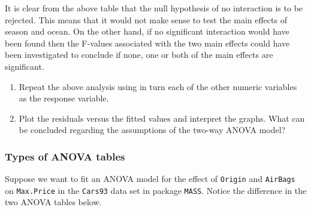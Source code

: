 \documentclass[
]{book}
\begin{document}
It is clear from the above table that the null hypothesis of no interaction is to be rejected. This means that it would not make sense to test the main effects of season and ocean. On the other hand, if no significant interaction would have been found then the F-values associated with the two main effects could have been investigated to conclude if none, one or both of the main effects are significant.

\begin{enumerate}
\def\labelenumi{(\alph{enumi})}
\item
  Repeat the above analysis using in turn each of the other numeric variables as the response variable.
\item
  Plot the residuals versus the fitted values and interpret the graphs. What can be concluded regarding the assumptions of the two-way ANOVA model?
\end{enumerate}

\subsubsection{Types of ANOVA tables}\label{types-of-anova-tables}

Suppose we want to fit an ANOVA model for the effect of \texttt{Origin} and \texttt{AirBags} on \texttt{Max.Price} in the \texttt{Cars93} data set in package \texttt{MASS}. Notice the difference in the two ANOVA tables below.
\end{document}

